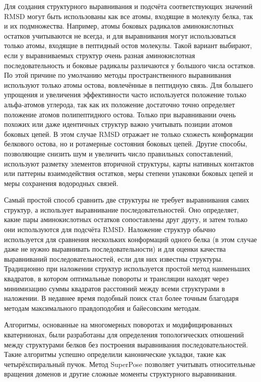 \documentclass[a4paper]{extreport}
\begin{document}
Для создания структурного выравнивания и подсчёта соответствующих значений RMSD могут быть использованы как все атомы, входящие в молекулу белка, так и их подмножества. Например, атомы боковых радикалов аминокислотных остатков учитываются не всегда, и для выравнивания могут использоваться только атомы, входящие в пептидный остов молекулы. Такой вариант выбирают, если у выравниваемых структур очень разная аминокислотная последовательность и боковые радикалы различаются у большого числа остатков. По этой причине по умолчанию методы пространственного выравнивания используют только атомы остова, вовлечённые в пептидную связь. Для большего упрощения и увеличения эффективности часто используется положение только альфа-атомов углерода, так как их положение достаточно точно определяет положение атомов полипептидного остова. Только при выравнивании очень похожих или даже идентичных структур важно учитывать позиции атомов боковых цепей. В этом случае RMSD отражает не только схожесть конформации белкового остова, но и ротамерные состояния боковых цепей. Другие способы, позволяющие снизить шум и увеличить число правильных сопоставлений, используют разметку элементов вторичной структуры, карты нативных контактов или паттерны взаимодействия остатков, меры степени упаковки боковых цепей и меры сохранения водородных связей.

Самый простой способ сравнить две структуры не требует выравнивания самих структур, а использует выравнивание последовательностей. Оно определяет, какие пары аминокислотных остатков сопоставлены друг другу, и затем только они используются для подсчёта RMSD. Наложение структур обычно используется для сравнения нескольких конформаций одного белка (в этом случае даже не нужно выравнивать последовательности) и для оценки качества выравниваний последовательностей, если для них известны структуры. Традиционно при наложении структур используется простой метод наименьших квадратов, в котором оптимальные повороты и трансляции находят через минимизацию суммы квадратов расстояний между всеми структурами в наложении. В недавнее время подобный поиск стал более точным благодаря методам максимального правдоподобия и байесовским методам.

Алгоритмы, основанные на многомерных поворотах и модифицированных кватернионах, были разработаны для определения топологических отношений между структурами белков без построения выравнивания последовательностей. Такие алгоритмы успешно определили канонические укладки, такие как четырёхспиральный пучок. Метод SuperPose позволяет учитывать относительные вращения доменов и другие сложные моменты структурного выравнивания.
\end{document}
